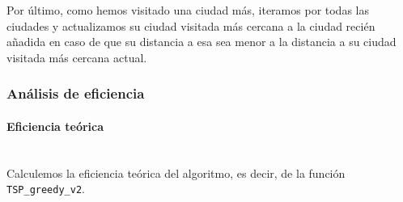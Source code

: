 \documentclass{article}
\newcommand{\myparagraph}[1]{\paragraph{#1}\mbox{}\\}
\begin{document}


Por último, como hemos visitado una ciudad más, iteramos por todas las ciudades y actualizamos su ciudad visitada más cercana a la ciudad recién añadida en caso de que su distancia a esa sea menor a la distancia a su ciudad visitada más cercana actual.

\subsubsection{Análisis de eficiencia}
\myparagraph{Eficiencia teórica}
Calculemos la eficiencia teórica del algoritmo, es decir, de la función \verb|TSP_greedy_v2|.\\


\end{document}
